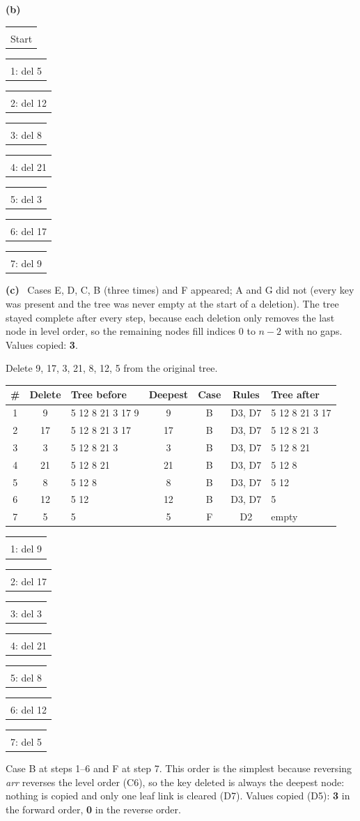 \documentclass[11pt]{article}
\makeatletter
\newcommand{\cbt}[4][3]{%
  \begin{tikzpicture}[x=1mm, y=1mm, baseline=(current bounding box.north)]
    \ifcase#1\or\def\cbtW{16}\or\def\cbtW{26}\or\def\cbtW{34}\or\def\cbtW{66}\fi
    \def\cbtN{0}%
    \if\relax\detokenize{#2}\relax\else\foreach \cbtV [count=\cbtC] in {#2} {\xdef\cbtN{\cbtC}}\fi
    \pgfmathsetmacro{\cbtH}{9*((\cbtN>1)+(\cbtN>3)+(\cbtN>7))}
    \useasboundingbox (0,5) rectangle (\cbtW,-\cbtH-5);
    \if\relax\detokenize{#2}\relax
      \node[font=\footnotesize\itshape] at (\cbtW/2,-\cbtH/2) {(empty)};
    \else
      \foreach \cbtV [count=\cbtK from 0] in {#2} {
        \pgfmathtruncatemacro{\cbtL}{(\cbtK>0)+(\cbtK>2)+(\cbtK>6)+(\cbtK>14)}
        \pgfmathsetmacro{\cbtX}{(\cbtK-(2^\cbtL-1)+0.5)*\cbtW/(2^\cbtL)}
        \node[bn] (n\cbtK) at (\cbtX,-9*\cbtL) {\cbtV};
        \ifnum\cbtK>0
          \pgfmathtruncatemacro{\cbtP}{(\cbtK-1)/2}
          \draw[thick] (n\cbtP) -- (n\cbtK);
        \fi
      }
    \fi
    \if\relax\detokenize{#3}\relax\else
      \foreach \cbtG in {#3} \draw[newc, line width=1.4pt] (n\cbtG.center) circle (3.9);
    \fi
    \if\relax\detokenize{#4}\relax\else
      \foreach \cbtG in {#4} \draw[tgtc, line width=1.4pt] (n\cbtG.center) circle (3.9);
    \fi
  \end{tikzpicture}}
\newcommand{\tcell}[2]{\begin{tabular}[t]{@{}c@{}}#2\\\footnotesize #1\end{tabular}}
\newcommand{\trow}[1]{\par\smallskip\noindent\null\hfill#1\hfill\null\par\smallskip}
\newcommand{\prob}[1]{\par\medskip\needspace{40mm}{\large\bfseries #1}\par\smallskip}
\newcommand{\pa}[2][0mm]{\par\smallskip\needspace{#1}\textbf{(#2)}\ }
\makeatother
\begin{document}
\pa{b}
\trow{\tcell{Start}{\cbt{5,12,8,21,3,17,9}{}{}}\hfill
      \tcell{1: del 5}{\cbt{9,12,8,21,3,17}{0}{}}\hfill
      \tcell{2: del 12}{\cbt{9,17,8,21,3}{1}{}}\hfill
      \tcell{3: del 8}{\cbt{9,17,3,21}{2}{}}}
\trow{\tcell{4: del 21}{\cbt{9,17,3}{}{}}\hfill
      \tcell{5: del 3}{\cbt{9,17}{}{}}\hfill
      \tcell{6: del 17}{\cbt{9}{}{}}\hfill
      \tcell{7: del 9}{\cbt[1]{}{}{}}}

\pa{c}
Cases E, D, C, B (three times) and F appeared; A and G did not (every key was present and the tree was
never empty at the start of a deletion). The tree stayed complete after every step, because each
deletion only removes the last node in level order, so the remaining nodes fill indices 0 to $n-2$
with no gaps. Values copied: \textbf{3}.

\prob{Bonus: Reverse Order}

Delete 9, 17, 3, 21, 8, 12, 5 from the original tree.
\begin{center}\small
\begin{tabular}{@{}cclcccl@{}}
\toprule
\# & Delete & Tree before & Deepest & Case & Rules & Tree after\\
\midrule
1 & 9  & 5 12 8 21 3 17 9 & 9  & B & D3, D7 & 5 12 8 21 3 17\\
2 & 17 & 5 12 8 21 3 17   & 17 & B & D3, D7 & 5 12 8 21 3\\
3 & 3  & 5 12 8 21 3      & 3  & B & D3, D7 & 5 12 8 21\\
4 & 21 & 5 12 8 21        & 21 & B & D3, D7 & 5 12 8\\
5 & 8  & 5 12 8           & 8  & B & D3, D7 & 5 12\\
6 & 12 & 5 12             & 12 & B & D3, D7 & 5\\
7 & 5  & 5                & 5  & F & D2     & empty\\
\bottomrule
\end{tabular}
\end{center}

\trow{\tcell{1: del 9}{\cbt{5,12,8,21,3,17}{}{}}\hfill
      \tcell{2: del 17}{\cbt{5,12,8,21,3}{}{}}\hfill
      \tcell{3: del 3}{\cbt{5,12,8,21}{}{}}\hfill
      \tcell{4: del 21}{\cbt{5,12,8}{}{}}}
\trow{\tcell{5: del 8}{\cbt{5,12}{}{}}\hfill
      \tcell{6: del 12}{\cbt{5}{}{}}\hfill
      \tcell{7: del 5}{\cbt[1]{}{}{}}}

Case B at steps 1--6 and F at step 7. This order is the simplest because reversing \textit{arr}
reverses the level order (C6), so the key deleted is always the deepest node: nothing is copied and
only one leaf link is cleared (D7). Values copied (D5): \textbf{3} in the forward order, \textbf{0} in
the reverse order.
\end{document}
